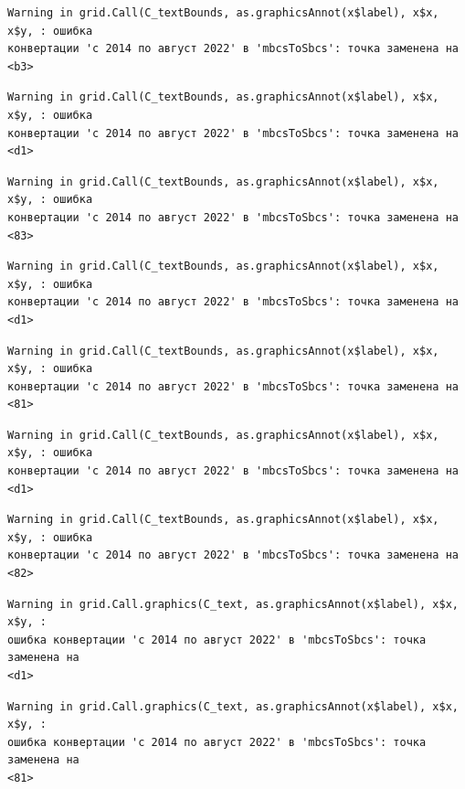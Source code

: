 \documentclass[
  letterpaper,
  DIV=11,
  numbers=noendperiod]{scrreprt}
\begin{document}
\begin{verbatim}
Warning in grid.Call(C_textBounds, as.graphicsAnnot(x$label), x$x, x$y, : ошибка
конвертации 'с 2014 по август 2022' в 'mbcsToSbcs': точка заменена на <b3>
\end{verbatim}

\begin{verbatim}
Warning in grid.Call(C_textBounds, as.graphicsAnnot(x$label), x$x, x$y, : ошибка
конвертации 'с 2014 по август 2022' в 'mbcsToSbcs': точка заменена на <d1>
\end{verbatim}

\begin{verbatim}
Warning in grid.Call(C_textBounds, as.graphicsAnnot(x$label), x$x, x$y, : ошибка
конвертации 'с 2014 по август 2022' в 'mbcsToSbcs': точка заменена на <83>
\end{verbatim}

\begin{verbatim}
Warning in grid.Call(C_textBounds, as.graphicsAnnot(x$label), x$x, x$y, : ошибка
конвертации 'с 2014 по август 2022' в 'mbcsToSbcs': точка заменена на <d1>
\end{verbatim}

\begin{verbatim}
Warning in grid.Call(C_textBounds, as.graphicsAnnot(x$label), x$x, x$y, : ошибка
конвертации 'с 2014 по август 2022' в 'mbcsToSbcs': точка заменена на <81>
\end{verbatim}

\begin{verbatim}
Warning in grid.Call(C_textBounds, as.graphicsAnnot(x$label), x$x, x$y, : ошибка
конвертации 'с 2014 по август 2022' в 'mbcsToSbcs': точка заменена на <d1>
\end{verbatim}

\begin{verbatim}
Warning in grid.Call(C_textBounds, as.graphicsAnnot(x$label), x$x, x$y, : ошибка
конвертации 'с 2014 по август 2022' в 'mbcsToSbcs': точка заменена на <82>
\end{verbatim}

\begin{verbatim}
Warning in grid.Call.graphics(C_text, as.graphicsAnnot(x$label), x$x, x$y, :
ошибка конвертации 'с 2014 по август 2022' в 'mbcsToSbcs': точка заменена на
<d1>
\end{verbatim}

\begin{verbatim}
Warning in grid.Call.graphics(C_text, as.graphicsAnnot(x$label), x$x, x$y, :
ошибка конвертации 'с 2014 по август 2022' в 'mbcsToSbcs': точка заменена на
<81>
\end{verbatim}
\end{document}
